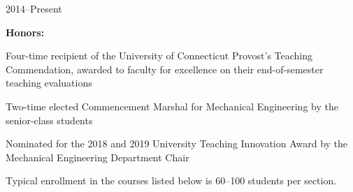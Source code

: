  \hfill 2014--Present

\textbf{Honors:}

\begin{innerlist}
    \item Four-time recipient of the University of Connecticut Provost's Teaching Commendation, awarded to faculty for excellence on their end-of-semester teaching evaluations
    \item Two-time elected Commencement Marshal for Mechanical Engineering by the senior-class students
    \item Nominated for the 2018 and 2019 University Teaching Innovation Award by the Mechanical Engineering Department Chair
\end{innerlist}
\vspace{0.5\baselineskip}
Typical enrollment in the courses listed below is 60--100 students per section.

